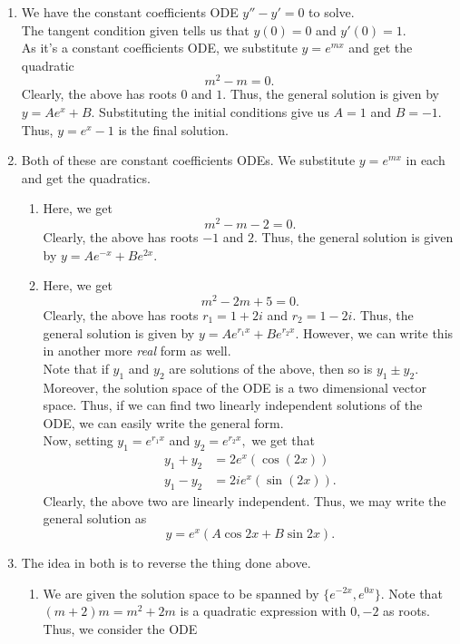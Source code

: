 \documentclass{article}
\begin{document}
\begin{enumerate}[label = Q.\arabic*.] 
	\item We have the constant coefficients ODE $y'' - y' = 0$ to solve.\\
	The tangent condition given tells us that $y(0) = 0$ and $y'(0) = 1.$\\
	As it's a constant coefficients ODE, we substitute $y = e^{mx}$ and get the quadratic
	\[m^2 - m = 0.\]
	Clearly, the above has roots $0$ and $1.$ Thus, the general solution is given by $y = Ae^x + B.$ Substituting the initial conditions give us $A = 1$ and $B = -1.$\\
	Thus, $y = e^x - 1$ is the final solution.
	\item \label{q2} Both of these are constant coefficients ODEs. We substitute $y = e^{mx}$ in each and get the quadratics.
	\begin{enumerate}[label = (\roman*)] 
		\item Here, we get
		\[m^2 - m - 2 = 0.\]
		Clearly, the above has roots $-1$ and $2.$ Thus, the general solution is given by $y = Ae^{-x} + Be^{2x}.$ 
		\item Here, we get
		\[m^2 - 2m + 5 = 0.\]
		Clearly, the above has roots $r_1 = 1 + 2i$ and $r_2 = 1 - 2i.$ Thus, the general solution is given by $y = Ae^{r_1x} + Be^{r_2x}.$ However, we can write this in another more \emph{real} form as well.\\
		Note that if $y_1$ and $y_2$ are solutions of the above, then so is $y_1 \pm y_2.$ Moreover, the solution space of the ODE is a two dimensional vector space. Thus, if we can find two linearly independent solutions of the ODE, we can easily write the general form.\\
		Now, setting $y_1 = e^{r_1x}$ and $y_2 = e^{r_2x},$ we get that
		\begin{align*} 
			y_1 + y_2 &= 2e^x(\cos(2x))\\
			y_1 - y_2 &= 2ie^x(\sin(2x)).
		\end{align*}
		Clearly, the above two are linearly independent. Thus, we may write the general solution as
		\[y = e^x(A\cos2x + B\sin 2x).\]
	\end{enumerate}
	\item The idea in both is to reverse the thing done above.
	\begin{enumerate}[label = (\roman*)] 
		\item We are given the solution space to be spanned by $\{e^{-2x}, e^{0x}\}.$ Note that $(m + 2)m = m^2 + 2m$ is a quadratic expression with $0, -2$ as roots. Thus, we consider the ODE

\end{enumerate}
\end{enumerate}
\end{document}
